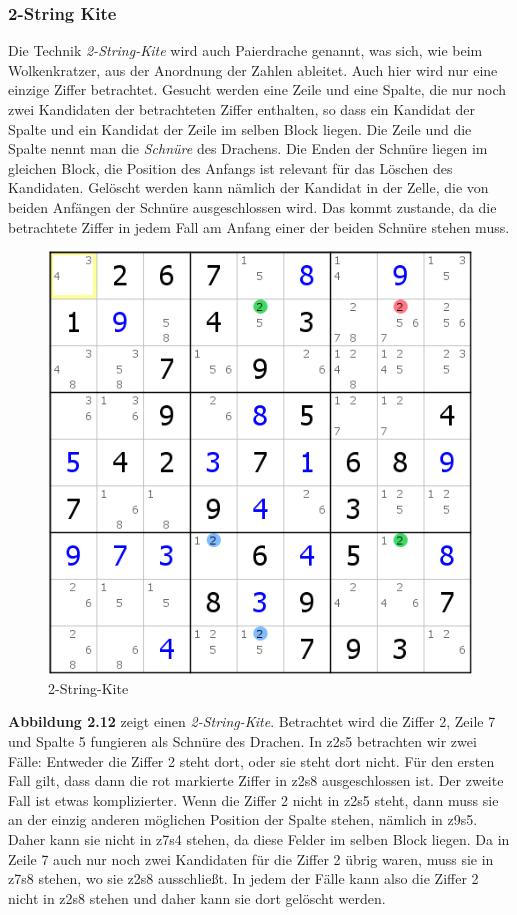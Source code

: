 \newpage
\subsubsection{2-String Kite}
Die Technik \textit{2-String-Kite} wird auch Paierdrache genannt, was sich, wie beim Wolkenkratzer, aus der Anordnung der Zahlen ableitet. Auch hier wird nur eine einzige Ziffer betrachtet. Gesucht werden eine Zeile und eine Spalte, die nur noch zwei Kandidaten der betrachteten Ziffer enthalten, so dass ein Kandidat der Spalte und ein Kandidat der Zeile im selben Block liegen. Die Zeile und die Spalte nennt man die \textit{Schnüre} des Drachens. Die Enden der Schnüre liegen im gleichen Block, die Position des Anfangs ist relevant für das Löschen des Kandidaten. Gelöscht werden kann nämlich der Kandidat in der Zelle, die von beiden Anfängen der Schnüre ausgeschlossen wird. Das kommt zustande, da die betrachtete Ziffer in jedem Fall am Anfang einer der beiden Schnüre stehen muss.

\begin{figure}[h]
\begin{center}
\includegraphics{./img/2stringkite.png}
\caption{2-String-Kite}
\end{center}
\end{figure}

\noindent \textbf{Abbildung 2.12} zeigt einen \textit{2-String-Kite}. Betrachtet wird die Ziffer 2, Zeile 7 und Spalte 5 fungieren als Schnüre des Drachen. In z2s5 betrachten wir zwei Fälle: Entweder die Ziffer 2 steht dort, oder sie steht dort nicht. Für den ersten Fall gilt, dass dann die rot markierte Ziffer in z2s8 ausgeschlossen ist. Der zweite Fall ist etwas komplizierter. Wenn die Ziffer 2 nicht in z2s5 steht, dann muss sie an der einzig anderen möglichen Position der Spalte stehen, nämlich in z9s5. Daher kann sie nicht in z7s4 stehen, da diese Felder im selben Block liegen. Da in Zeile 7 auch nur noch zwei Kandidaten für die Ziffer 2 übrig waren, muss sie in z7s8 stehen, wo sie z2s8 ausschließt. In jedem der Fälle kann also die Ziffer 2 nicht in z2s8 stehen und daher kann sie dort gelöscht werden.